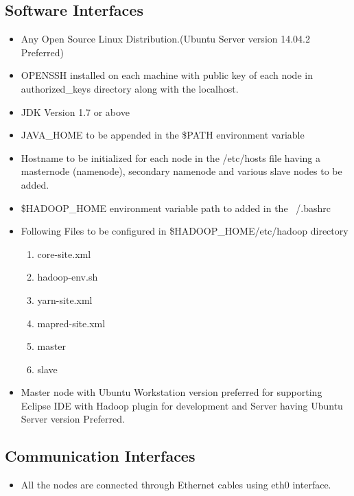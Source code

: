 \documentclass[11pt,letterpaper]{article}
\begin{document}
\subsection{Software Interfaces}

\begin{itemize}
\item Any Open Source Linux Distribution.(Ubuntu Server version 14.04.2 Preferred)
\item OPENSSH installed on each machine with public key of each node in authorized\_keys directory along with the localhost.
\item JDK Version 1.7 or above
\item JAVA\_HOME to be appended in the \$PATH environment variable
\item Hostname to be initialized for each node in the /etc/hosts file having a masternode (namenode), secondary namenode and various slave nodes to be added.
\item \$HADOOP\_HOME environment variable path to added in the ~/.bashrc 
\item Following Files to be configured in \$HADOOP\_HOME/etc/hadoop directory

	\begin{enumerate}
	\item core-site.xml
	\item hadoop-env.sh
	\item yarn-site.xml
	\item mapred-site.xml
	\item master
	\item slave
	\end{enumerate}

\item Master node with Ubuntu Workstation version preferred for supporting Eclipse IDE with Hadoop plugin for development and Server having Ubuntu Server version Preferred.
\end{itemize}

\subsection{Communication Interfaces}

\begin{itemize}
\item All the nodes are connected through Ethernet cables using eth0 interface.
\end{itemize}

\newpage
\end{document}
